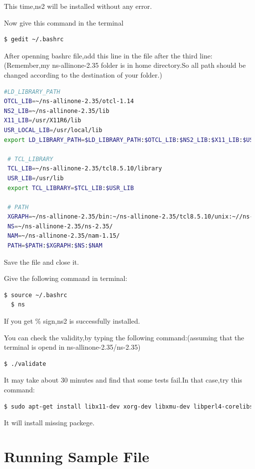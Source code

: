 \documentclass[hidelinks,12pt]{report}
\begin{document}
This time,ns2 will be installed without any error.

Now give this command in the terminal
\begin{lstlisting}[language=bash]
  $ gedit ~/.bashrc 
\end{lstlisting}
After openning bashrc file,add this line in the file after the third line:(Remember,my ns-allinone-2.35 folder is in home directory.So all path should be changed according to the destination of your folder.)
\begin{lstlisting}[language=bash]
#LD_LIBRARY_PATH
OTCL_LIB=~/ns-allinone-2.35/otcl-1.14
NS2_LIB=~/ns-allinone-2.35/lib
X11_LIB=/usr/X11R6/lib
USR_LOCAL_LIB=/usr/local/lib
export LD_LIBRARY_PATH=$LD_LIBRARY_PATH:$OTCL_LIB:$NS2_LIB:$X11_LIB:$USR_LOCAL_LIB

 # TCL_LIBRARY
 TCL_LIB=~/ns-allinone-2.35/tcl8.5.10/library
 USR_LIB=/usr/lib
 export TCL_LIBRARY=$TCL_LIB:$USR_LIB

 # PATH
 XGRAPH=~/ns-allinone-2.35/bin:~/ns-allinone-2.35/tcl8.5.10/unix:~//ns-allinone-2.35/tk8.5.10/unix
 NS=~/ns-allinone-2.35/ns-2.35/
 NAM=~/ns-allinone-2.35/nam-1.15/
 PATH=$PATH:$XGRAPH:$NS:$NAM
\end{lstlisting}
Save the file and close it.

Give the following command in terminal:
\begin{lstlisting}[language=bash]
  $ source ~/.bashrc 
  $ ns
\end{lstlisting}
If you get \% sign,ns2 is successfully installed.

You can check the validity,by typing the following command:(assuming that the terminal is opend in ns-allinone-2.35/ns-2.35)
\begin{lstlisting}[language=bash]
  $ ./validate
\end{lstlisting}
It may take about 30 minutes and find that some tests fail.In that case,try this command:
\begin{lstlisting}[language=bash]
  $ sudo apt-get install libx11-dev xorg-dev libxmu-dev libperl4-corelibs-perl
\end{lstlisting}
It will install missing packege.
\chapter{Running Sample File}
\end{document}
